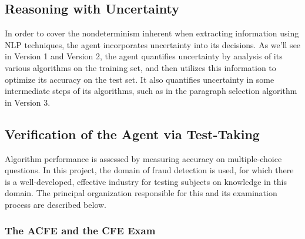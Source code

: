 

\subsection{Reasoning with Uncertainty}

In order to cover the nondeterminism inherent when extracting information using NLP techniques, the agent incorporates uncertainty into its decisions.  As we'll see in Version 1 and Version 2, the agent quantifies uncertainty by analysis of its various algorithms on the training set, and then utilizes this information to optimize its accuracy on the test set.  It also quantifies uncertainty in some intermediate steps of its algorithms, such as in the paragraph selection algorithm in Version 3.

\subsection{Verification of the Agent via Test-Taking}

Algorithm performance is assessed by measuring accuracy on multiple-choice questions.  In this project, the domain of fraud detection is used, for which there is a well-developed, effective industry for testing subjects on knowledge in this domain.  The principal organization responsible for this and its examination process are described below.

\subsubsection{The ACFE and the CFE Exam}


